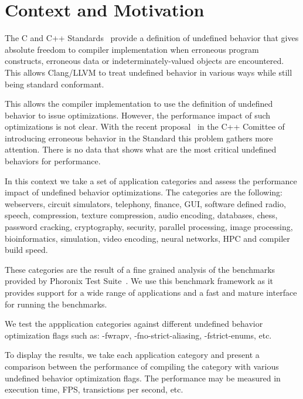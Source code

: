 \section{Context and Motivation}

The C and C++ Standards~\cite{c17,cpp17} provide a definition of
undefined behavior that gives absolute freedom to compiler
implementation when erroneous program constructs, erroneous data or
indeterminately-valued objects are encountered. This allows Clang/LLVM
to treat undefined behavior in various ways while still being standard
conformant.

This allows the compiler implementation to use the definition of
undefined behavior to issue optimizations. However, the performance
impact of such optimizations is not clear. With the recent
proposal~\cite{eb} in the C++ Comittee of introducing erroneous behavior
in the Standard this problem gathers more attention. There is no data
that shows what are the most critical undefined behaviors for
performance.

In this context we take a set of application categories and assess the
performance impact of undefined behavior optimizations. The categories
are the following: webservers, circuit simulators, telephony, finance,
GUI, software defined radio, speech, compression, texture compression,
audio encoding, databases, chess, password cracking, cryptography,
security, parallel processing, image processing, bioinformatics,
simulation, video encoding, neural networks, HPC and compiler build
speed.

These categories are the result of a fine grained analysis of the
benchmarks provided by Phoronix Test Suite~\cite{pts}. We use this
benchmark framework as it provides support for a wide range of
applications and a fast and mature interface for running the benchmarks.

We test the appplication categories against different undefined behavior
optimization flags such as: -fwrapv, -fno-strict-aliasing,
-fstrict-enums, etc.

To display the results, we take each application category and present a
comparison between the performance of compiling the category with
various undefined behavior optimization flags. The performance may be
measured in execution time, FPS, transictions per second, etc.
